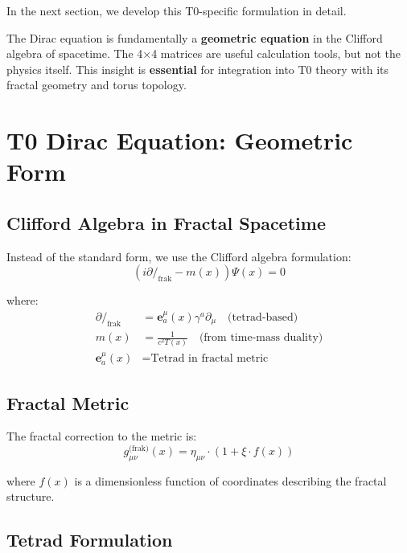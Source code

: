 In the next section, we develop this T0-specific formulation in detail.

\begin{keypoint}
	The Dirac equation is fundamentally a \textbf{geometric equation} in the Clifford algebra of spacetime. The 4×4 matrices are useful calculation tools, but not the physics itself. This insight is \textbf{essential} for integration into T0 theory with its fractal geometry and torus topology.
\end{keypoint}	
	\section{T0 Dirac Equation: Geometric Form}
	
	\subsection{Clifford Algebra in Fractal Spacetime}
	
	Instead of the standard form, we use the Clifford algebra formulation:
	\begin{equation}
		\boxed{(i \partial\!\!\!/_{\text{frak}} - m(x))\Psi(x) = 0}
		\label{eq:t0_dirac}
	\end{equation}
	
	where:
	\begin{align}
		\partial\!\!\!/_{\text{frak}} &= \mathbf{e}^\mu_a(x) \gamma^a \partial_\mu 
		\quad \text{(tetrad-based)} \\
		m(x) &= \frac{1}{c^2 T(x)} \quad \text{(from time-mass duality)} \\
		\mathbf{e}^\mu_a(x) &= \text{Tetrad in fractal metric}
	\end{align}
	
	\subsection{Fractal Metric}
	
	The fractal correction to the metric is:
	\begin{equation}
		g_{\mu\nu}^{\text{(frak)}}(x) = \eta_{\mu\nu} \cdot \left(1 + \xi \cdot f(x)\right)
		\label{eq:fractal_metric}
	\end{equation}
	
	where $f(x)$ is a dimensionless function of coordinates describing the fractal structure.
	
	\subsection{Tetrad Formulation}
	
